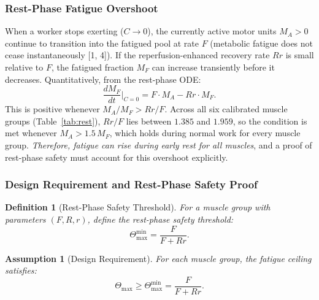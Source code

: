 \documentclass[11pt,a4paper]{article}
\newtheorem{definition}[theorem]{Definition}
\newtheorem{assumption}[theorem]{Assumption}
\begin{document}
\subsubsection{Rest-Phase Fatigue Overshoot}

When a worker stops exerting ($C \to 0$), the currently active motor
units $M_A > 0$ continue to transition into the fatigued pool at rate
$F$ (metabolic fatigue does not cease instantaneously [1, 4]). If the
reperfusion-enhanced recovery rate $Rr$ is small relative to $F$, the
fatigued fraction $M_F$ can increase transiently before it decreases.
Quantitatively, from the rest-phase ODE:
\begin{equation}\label{eq:dmf-rest}
\frac{dM_F}{dt}\bigg|_{C=0} = F \cdot M_A - Rr \cdot M_F.
\end{equation}
This is positive whenever $M_A / M_F > Rr / F$. Across all six
calibrated muscle groups (Table~\ref{tab:rest}), $Rr/F$ lies between
$1.385$ and $1.959$, so the condition is met whenever
$M_A > 1.5\,M_F$, which holds during normal work for every muscle
group. \emph{Therefore, fatigue can rise during early rest for all
muscles}, and a proof of rest-phase safety must account for this
overshoot explicitly.

\subsubsection{Design Requirement and Rest-Phase Safety Proof}

\begin{definition}[Rest-Phase Safety Threshold]\label{def:rest-threshold}
For a muscle group with parameters $(F, R, r)$, define the rest-phase
safety threshold:
\begin{equation}\label{eq:theta-min-max}
\Theta_{\max}^{\min} = \frac{F}{F + Rr}.
\end{equation}
\end{definition}

\begin{assumption}[Design Requirement]\label{asm:design}
For each muscle group, the fatigue ceiling satisfies:
\begin{equation}\label{eq:design-req}
\Theta_{\max} \geq \Theta_{\max}^{\min} = \frac{F}{F + Rr}.
\end{equation}
\end{assumption}
\end{document}
